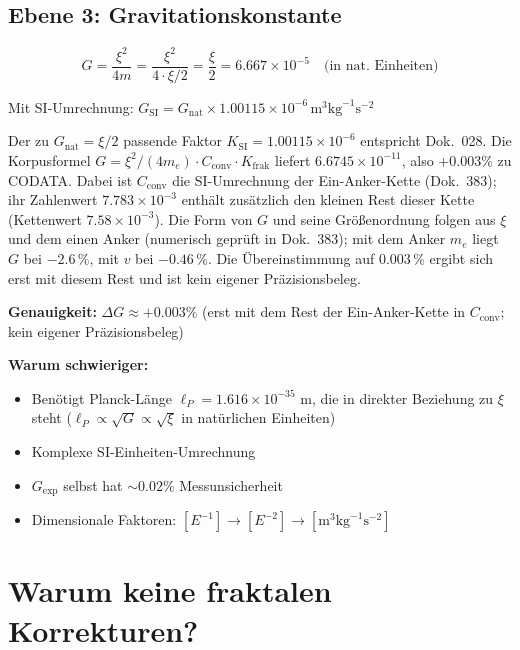 	\subsection{Ebene 3: Gravitationskonstante}
	
	\begin{equation}
		G = \frac{\xi^2}{4m} = \frac{\xi^2}{4 \cdot \xi/2} = \frac{\xi}{2} = 6.667 \times 10^{-5} \quad \text{(in nat. Einheiten)}
	\end{equation}
	
	Mit SI-Umrechnung: $G_{\text{SI}} = G_{\text{nat}} \times 1.00115 \times 10^{-6}\,\text{m}^3\text{kg}^{-1}\text{s}^{-2}$
	
	Der zu $G_{\text{nat}} = \xi/2$ passende Faktor $K_{\text{SI}} = 1.00115\times10^{-6}$ entspricht Dok.~028. Die Korpusformel $G = \xi^2/(4m_e)\cdot C_{\text{conv}}\cdot K_{\text{frak}}$ liefert $6.6745\times10^{-11}$, also $+0.003\%$ zu CODATA. Dabei ist $C_{\text{conv}}$ die SI-Umrechnung der Ein-Anker-Kette (Dok.~383); ihr Zahlenwert $7.783\times10^{-3}$ enthält zusätzlich den kleinen Rest dieser Kette (Kettenwert $7.58\times10^{-3}$). Die Form von $G$ und seine Größenordnung folgen aus $\xi$ und dem einen Anker (numerisch geprüft in Dok.~383); mit dem Anker $m_e$ liegt $G$ bei $-2.6\,\%$, mit $v$ bei $-0.46\,\%$. Die Übereinstimmung auf $0.003\,\%$ ergibt sich erst mit diesem Rest und ist kein eigener Präzisionsbeleg.
	
	\begin{tcolorbox}[colback=yellow!5!white,colframe=orange!75!black,title=Komplexe $\xi$-Form]
		\textbf{Genauigkeit:} $\Delta G \approx +0.003\%$ (erst mit dem Rest der Ein-Anker-Kette in $C_{\text{conv}}$; kein eigener Präzisionsbeleg)
		
		\textbf{Warum schwieriger:}
		\begin{itemize}
			\item Benötigt Planck-Länge $\ell_P = 1.616 \times 10^{-35}$ m, die in direkter Beziehung zu $\xi$ steht ($\ell_P \propto \sqrt{G} \propto \sqrt{\xi}$ in natürlichen Einheiten)
			\item Komplexe SI-Einheiten-Umrechnung
			\item $G_{\exp}$ selbst hat $\sim 0.02\%$ Messunsicherheit
			\item Dimensionale Faktoren: $[E^{-1}] \to [E^{-2}] \to [\text{m}^3\text{kg}^{-1}\text{s}^{-2}]$
		\end{itemize}
	\end{tcolorbox}
	
	\section{Warum keine fraktalen Korrekturen?}
	
